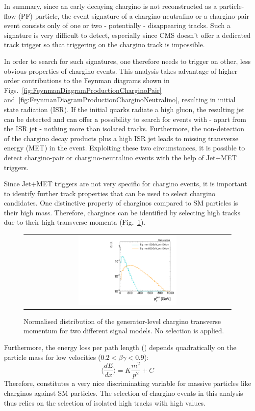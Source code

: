 In summary, since an early decaying chargino is not reconstructed as a particle-flow (PF) particle, the event signature of a chargino-neutralino or a chargino-pair event consists only of one or two - potentially - disappearing tracks. 
Such a signature is very difficult to detect, especially since CMS doesn't offer a dedicated track trigger so that triggering on the chargino track is impossible.


In order to search for such signatures, one therefore needs to trigger on other, less obvious properties of chargino events. 
This analysis takes advantage of higher order contributions to the Feynman diagrams shown in Figs.~\ref{fig:FeynmanDiagramProductionCharginoPair} and~\ref{fig:FeynmanDiagramProductionCharginoNeutralino}, resulting in initial state radiation (ISR).
If the initial quarks radiate a high \pt gluon, the resulting jet can be detected and can offer a possibility to search for events with - apart from the ISR jet - nothing more than isolated tracks.
Furthermore, the non-detection of the chargino decay products plus a high \pt ISR jet leads to missing transverse energy (MET) in the event. 
Exploiting these two circumstances, it is possible to detect chargino-pair or chargino-neutralino events with the help of Jet+MET triggers.

Since Jet+MET triggers are not very specific for chargino events, it is important to identify further track properties that can be used to select chargino candidates.
One distinctive property of charginos compared to SM particles is their high mass. 
Therefore, charginos can be identified by selecting high \pt tracks due to their high transverse momenta (Fig.~\ref{fig:TrackPt_2Signal_noSelection_normalized}). 
\begin{figure}[!b]
  \centering 
  \begin{tabular}{c}
  \includegraphics[width=0.49\textwidth]{figures/analysis_2/MotivationAndGeneralSearchStrategy/hgenPtChiMiddleBinning_log.pdf}
  \end{tabular}
  \caption{Normalised distribution of the generator-level chargino transverse momentum for two different signal models. No selection is applied.} 
  \label{fig:TrackPt_2Signal_noSelection_normalized}
\end{figure}
Furthermore, the energy loss per path length (\dedx) depends quadratically on the particle mass for low velocities ($0.2<\beta\gamma<0.9$):
\begin{equation}
\langle\frac{dE}{dx}\rangle = K \frac{m^2}{p^2} +C
\end{equation}
Therefore, \dedx constitutes a very nice discriminating variable for massive particles like charginos against SM particles.
The selection of chargino events in this analysis thus relies on the selection of isolated high \pt tracks with high \dedx values. 

